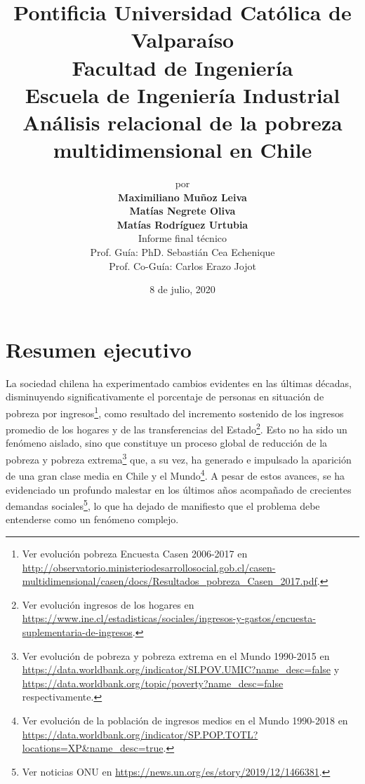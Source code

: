 \documentclass[12pt,letterpaper,spanish]{article}
\title{
Pontificia Universidad Católica de Valparaíso\\
Facultad de Ingeniería\\
Escuela de Ingeniería Industrial\vspace{3em}\\
\textbf{Análisis relacional de la pobreza multidimensional en Chile}} %
\author{\LARGE{por}\vspace{1em}\\
\textbf{\LARGE{Maximiliano Muñoz Leiva}}\vspace{1.5mm}\\
\textbf{\LARGE{Matías Negrete Oliva}}\vspace{1.5mm}\\
\textbf{\LARGE{Matías Rodríguez Urtubia}}\vspace{3em}\\
\LARGE{Informe final técnico}\vspace{2em}\\
\LARGE{Prof. Guía: PhD. Sebastián Cea Echenique}\vspace{1em}\\
\LARGE{Prof. Co-Guía: Carlos Erazo Jojot}\vspace{3em}}
\date{\LARGE{8 de julio, 2020}}
\begin{document}
\setcounter{tocdepth}{4}
\setcounter{secnumdepth}{4}

\renewcommand{\listtablename}{Lista de Tablas}%
\renewcommand{\listfigurename}{Lista de Figuras} %

\maketitle
\thispagestyle{empty}
\pagestyle{fancy}
\setlength{\parindent}{1cm} %
\setlength{\parskip}{1em}
\newpage
\begin{center}%
\tableofcontents
\clearpage
\listoffigures
\clearpage
\glsaddall
\glsaddallunused
\printglossary[type=main]
\clearpage
\end{center}%

\section*{Resumen ejecutivo} %
La sociedad chilena ha experimentado cambios evidentes en las últimas décadas, disminuyendo significativamente el porcentaje de personas en situación de pobreza por ingresos\footnote{Ver evolución pobreza Encuesta Casen 2006-2017 en \url{http://observatorio.ministeriodesarrollosocial.gob.cl/casen-multidimensional/casen/docs/Resultados_pobreza_Casen_2017.pdf}.}, como resultado del incremento sostenido de los ingresos promedio de los hogares y de las transferencias del Estado\footnote{Ver evolución ingresos de los hogares en \url{https://www.ine.cl/estadisticas/sociales/ingresos-y-gastos/encuesta-suplementaria-de-ingresos}.}. Esto no ha sido un fenómeno aislado, sino que constituye un proceso global de reducción de la pobreza y pobreza extrema\footnote{Ver evolución de pobreza y pobreza extrema en el Mundo 1990-2015 en \url{https://data.worldbank.org/indicator/SI.POV.UMIC?name_desc=false} y \url{https://data.worldbank.org/topic/poverty?name_desc=false} respectivamente.} que, a su vez, ha generado e impulsado la aparición de una gran clase media en Chile \cite{Candia2017RadiografiaPublica} y el Mundo\footnote{Ver evolución de la población de ingresos medios en el Mundo 1990-2018 en \url{https://data.worldbank.org/indicator/SP.POP.TOTL?locations=XP&name_desc=true}.}. A pesar de estos avances, se ha evidenciado un profundo malestar en los últimos años acompañado de crecientes demandas sociales\footnote{Ver noticias ONU en \url{https://news.un.org/es/story/2019/12/1466381}.}, lo que ha dejado de manifiesto que el problema debe entenderse como un fenómeno complejo.  
\end{document}

